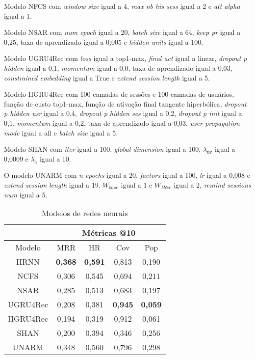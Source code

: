 Modelo NFCS com \textit{window size} igual a 4, \textit{max nb his sess} igual a
2 e \textit{att alpha} igual a 1.

Modelo NSAR com \textit{num epoch} igual a 20, \textit{batch size} igual a 64,
\textit{keep pr} igual a 0,25, taxa de aprendizado igual a 0,005 e \textit{hidden
units} igual a 100.

Modelo UGRU4Rec com \textit{loss} igual a top1-max, \textit{final act} igual a
linear, \textit{dropout p hidden} igual a 0,1, \textit{momentum} igual a 0,0,
taxa de aprendizado igual a 0,03, \textit{constrained embedding} igual a True e
\textit{extend session length} igual a 5.

Modelo HGRU4Rec com 100 camadas de sessões e 100 camadas de usuários, função de
custo top1-max, função de ativação final tangente hiperbólica,
\textit{dropout p hidden usr} igual a 0,4, \textit{dropout p hidden ses} igual a
0,2, \textit{dropout p init} igual a 0,1, \textit{momentum} igual a 0,2, taxa de
aprendizado igual a 0,03, \textit{user propagation mode} igual a all e
\textit{batch size} igual a 5.


Modelo SHAN com \textit{iter} igual a 100, \textit{global dimension} igual a
100, $\lambda_{\text{uv}}$ igual a 0,0009 e $\lambda_{\text{a}}$ igual a 10.

O modelo UNARM com \textit{n epochs} igual a 20, \textit{factors} igual a 100,
\textit{lr} igual a 0,008 e \textit{extend session length} igual a 19. $W_{base}$
igual a 1 e $W_{IRec}$ igual a 2, \textit{remind sessions num} igual a 5.

\begin{table}[htbp]
  \centering
  \begin{tabular}{|c|c|c|c|c|}
    \hline
      \multicolumn{1}{|c|}{} & \multicolumn{4}{c|}{Métricas @10} \\
      \hline
      Modelo & MRR & HR & Cov & Pop \\
      \hline
      IIRNN & \textbf{0,368} & \textbf{0,591} & 0,813 & 0,190 \\
      \hline
      NCFS & 0,306 & 0,545 & 0,694 & 0,211 \\
      \hline
      NSAR & 0,285 & 0,513 & 0,683 & 0,197 \\
      \hline
      UGRU4Rec & 0,208 & 0,381 & \textbf{0,945} & \textbf{0,059} \\
      \hline
      HGRU4Rec & 0,194 & 0,319 & 0,912 & 0,061 \\ 
      \hline
      SHAN & 0,200 & 0,394 & 0,346 & 0,256 \\
      \hline
      UNARM & 0,348 & 0,560 & 0,796 & 0,298 \\
      \hline
      \end{tabular}
      \caption{Modelos de redes neurais}
      \label{tab:nn_models_aware}
\end{table}


